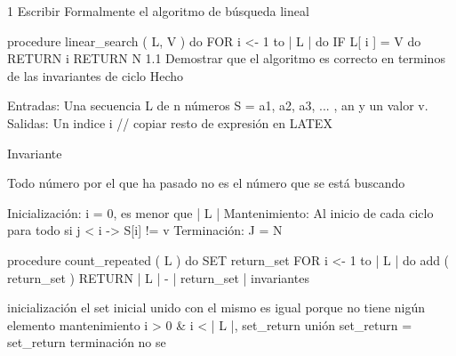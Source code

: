 1 Escribir Formalmente  el algoritmo de búsqueda lineal

procedure linear_search ( L, V ) do
  FOR i <- 1 to | L | do
    IF L[ i ] = V do
      RETURN i
  RETURN N
1.1 Demostrar que el algoritmo es correcto  en terminos de las invariantes de ciclo
Hecho

Entradas: Una secuencia L  de n números S = { a1, a2, a3, ... , an }  y un valor v.
Salidas: Un indice i  // copiar resto de expresión en LATEX

Invariante

Todo número por el que ha pasado no es el número que se está buscando

Inicialización:
  i = 0, es menor que | L |
Mantenimiento:
  Al inicio de cada ciclo para todo si j < i -> S[i]  != v  
Terminación:
  J = N



procedure count_repeated ( L ) do
  SET return_set
  FOR i <- 1 to | L | do
    add ( return_set )
  RETURN | L | - | return_set |
invariantes

inicialización
  el set inicial unido con el mismo es igual porque no tiene nigún elemento
mantenimiento
   i > 0 & i < | L |, set_return  unión set_return = set_return
terminación
  no se
